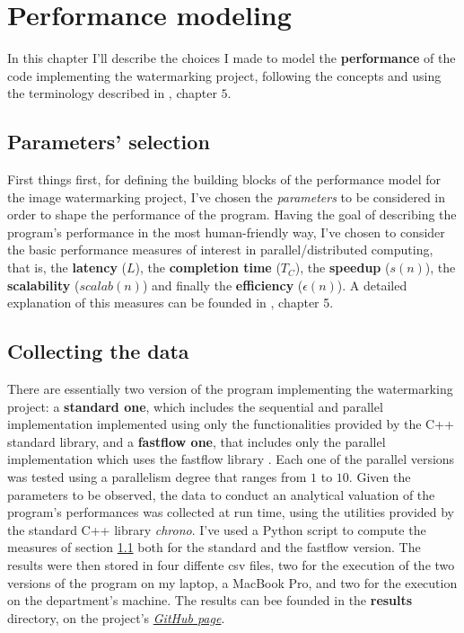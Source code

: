 \chapter{Performance modeling} %
\label{cha:performance_modeling}
    In this chapter I'll describe the choices I made to model the \textbf{performance} of the code implementing
    the watermarking project, following the concepts and using the terminology described in \cite{DSPM}, chapter
    $5$.
    \section{Parameters' selection} %
    \label{sec:parameters}
        First things first, for defining the building blocks of the performance model for the image
        watermarking project, I've chosen the \textit{parameters} to be considered in order to shape the
        performance of the program. Having the goal of describing the program's performance in
        the most human-friendly way, I've chosen to consider the basic performance measures of interest in
        parallel/distributed computing, that is, the \textbf{latency} ($L$), the \textbf{completion time}
        ($T_C$), the \textbf{speedup} ($s(n)$), the \textbf{scalability}
        ($\mathit{scalab}(n)$) and finally the \textbf{efficiency} ($\epsilon(n)$). A detailed explanation of
        this measures can be founded in \cite{DSPM}, chapter 5.

    \section{Collecting the data} %
    \label{sec:model_s_usage}
        There are essentially two version of the program implementing the watermarking project: a
        \textbf{standard one}, which includes the sequential and parallel implementation implemented using only
        the functionalities provided by the C++ standard library, and a \textbf{fastflow one}, that includes only
        the parallel implementation which uses the fastflow library \cite{fastflow}. Each one of the parallel
        versions was tested using a parallelism degree that ranges from $1$ to $10$. Given the parameters to be
        observed, the data to conduct an analytical valuation of the program's performances was collected at run
        time, using the utilities provided by the standard C++ library \textit{chrono}. I've used a Python
        script to compute the measures of section \ref{sec:parameters} both for the standard and the fastflow
        version. The results were then stored in four diffente csv files, two for the execution of the two
        versions of the program on my laptop, a MacBook Pro, and two for the execution on the department's
        machine. The results can bee founded in the \textbf{results} directory, on the project's
        \href{https://github.com/germz01/PDS_project}{\textit{GitHub page}}.

